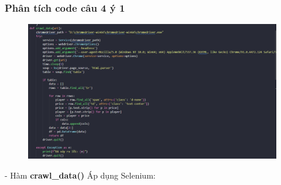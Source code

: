 \documentclass[12pt, letterpaper]{article}
\begin{document}
\subsubsection{Phân tích code câu 4 ý 1}
\begin{figure}[H]
    \centering
    \includegraphics[width=1\linewidth]{img/4_1-1.png}
\end{figure}
- Hàm \textbf{crawl\_data()} Áp dụng Selenium:
\end{document}
